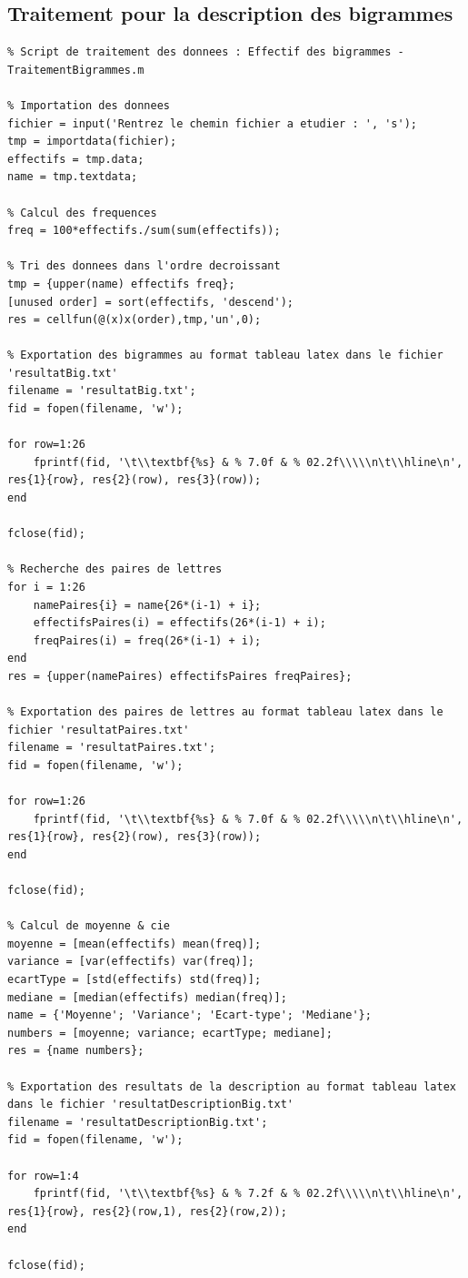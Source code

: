 \documentclass[a4paper, titlepage]{livret}
\begin{document}
\subsection{Traitement pour la description des bigrammes}
\begin{lstlisting}
% Script de traitement des donnees : Effectif des bigrammes - TraitementBigrammes.m

% Importation des donnees
fichier = input('Rentrez le chemin fichier a etudier : ', 's');
tmp = importdata(fichier);
effectifs = tmp.data;
name = tmp.textdata;

% Calcul des frequences
freq = 100*effectifs./sum(sum(effectifs));

% Tri des donnees dans l'ordre decroissant
tmp = {upper(name) effectifs freq};
[unused order] = sort(effectifs, 'descend');
res = cellfun(@(x)x(order),tmp,'un',0);

% Exportation des bigrammes au format tableau latex dans le fichier 'resultatBig.txt'
filename = 'resultatBig.txt';
fid = fopen(filename, 'w');

for row=1:26
    fprintf(fid, '\t\\textbf{%s} & % 7.0f & % 02.2f\\\\\n\t\\hline\n', res{1}{row}, res{2}(row), res{3}(row));
end

fclose(fid);

% Recherche des paires de lettres
for i = 1:26 
    namePaires{i} = name{26*(i-1) + i};
    effectifsPaires(i) = effectifs(26*(i-1) + i);
    freqPaires(i) = freq(26*(i-1) + i);
end
res = {upper(namePaires) effectifsPaires freqPaires}; 

% Exportation des paires de lettres au format tableau latex dans le fichier 'resultatPaires.txt'
filename = 'resultatPaires.txt';
fid = fopen(filename, 'w');

for row=1:26
    fprintf(fid, '\t\\textbf{%s} & % 7.0f & % 02.2f\\\\\n\t\\hline\n', res{1}{row}, res{2}(row), res{3}(row));
end

fclose(fid);

% Calcul de moyenne & cie
moyenne = [mean(effectifs) mean(freq)];
variance = [var(effectifs) var(freq)];
ecartType = [std(effectifs) std(freq)];
mediane = [median(effectifs) median(freq)];
name = {'Moyenne'; 'Variance'; 'Ecart-type'; 'Mediane'};
numbers = [moyenne; variance; ecartType; mediane];
res = {name numbers};

% Exportation des resultats de la description au format tableau latex dans le fichier 'resultatDescriptionBig.txt'
filename = 'resultatDescriptionBig.txt';
fid = fopen(filename, 'w');

for row=1:4
    fprintf(fid, '\t\\textbf{%s} & % 7.2f & % 02.2f\\\\\n\t\\hline\n', res{1}{row}, res{2}(row,1), res{2}(row,2));
end

fclose(fid);
\end{lstlisting}
\end{document}
